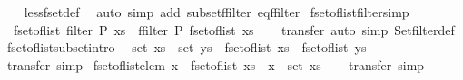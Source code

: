 \begin{isabellebody}
%
\isadelimproof
\ \ %
\endisadelimproof
%
\isatagproof
{}\isamarkupfalse%
\ less{\isacharunderscore}fset{\isacharunderscore}def\ \isamarkupfalse%
\ {\isacharparenleft}auto\ simp\ add{\isacharcolon}\ subset{\isacharunderscore}ffilter\ eq{\isacharunderscore}ffilter{\isacharparenright}%
\endisatagproof
{\isafoldproof}%
%
\isadelimproof
%
\endisadelimproof
%
\isadelimdocument
%
\endisadelimdocument
%
\isatagdocument
%
\isamarkuptrue%
%
\endisatagdocument
{\isafolddocument}%
%
\isadelimdocument
%
\endisadelimdocument
{}\isamarkupfalse%
\ fset{\isacharunderscore}of{\isacharunderscore}list{\isacharunderscore}filter{\isacharbrackleft}simp{\isacharbrackright}{\isacharcolon}\isanewline
\ \ {\isachardoublequoteopen}fset{\isacharunderscore}of{\isacharunderscore}list\ {\isacharparenleft}filter\ P\ xs{\isacharparenright}\ {\isacharequal}\ ffilter\ P\ {\isacharparenleft}fset{\isacharunderscore}of{\isacharunderscore}list\ xs{\isacharparenright}{\isachardoublequoteclose}\isanewline
%
\isadelimproof
\ \ %
\endisadelimproof
%
\isatagproof
{}\isamarkupfalse%
\ transfer\ {\isacharparenleft}auto\ simp{\isacharcolon}\ Set{\isachardot}filter{\isacharunderscore}def{\isacharparenright}%
\endisatagproof
{\isafoldproof}%
%
\isadelimproof
\isanewline
%
\endisadelimproof
\isanewline
{}\isamarkupfalse%
\ fset{\isacharunderscore}of{\isacharunderscore}list{\isacharunderscore}subset{\isacharbrackleft}intro{\isacharbrackright}{\isacharcolon}\isanewline
\ \ {\isachardoublequoteopen}set\ xs\ {\isasymsubseteq}\ set\ ys\ {\isasymLongrightarrow}\ fset{\isacharunderscore}of{\isacharunderscore}list\ xs\ {\isacharbar}{\isasymsubseteq}{\isacharbar}\ fset{\isacharunderscore}of{\isacharunderscore}list\ ys{\isachardoublequoteclose}\isanewline
%
\isadelimproof
\ \ %
\endisadelimproof
%
\isatagproof
{}\isamarkupfalse%
\ transfer\ simp%
\endisatagproof
{\isafoldproof}%
%
\isadelimproof
\isanewline
%
\endisadelimproof
\isanewline
{}\isamarkupfalse%
\ fset{\isacharunderscore}of{\isacharunderscore}list{\isacharunderscore}elem{\isacharcolon}\ {\isachardoublequoteopen}{\isacharparenleft}x\ {\isacharbar}{\isasymin}{\isacharbar}\ fset{\isacharunderscore}of{\isacharunderscore}list\ xs{\isacharparenright}\ {\isasymlongleftrightarrow}\ {\isacharparenleft}x\ {\isasymin}\ set\ xs{\isacharparenright}{\isachardoublequoteclose}\isanewline
%
\isadelimproof
\ \ %
\endisadelimproof
%
\isatagproof
{}\isamarkupfalse%
\ transfer\ simp%

\end{isabellebody}
